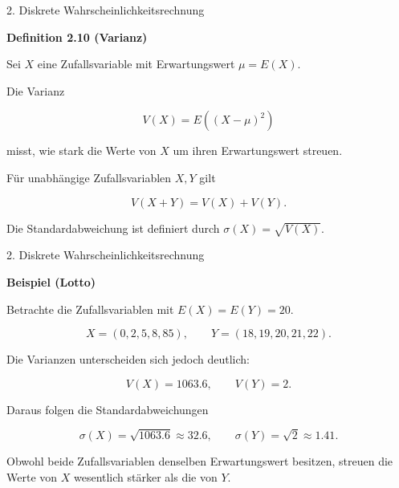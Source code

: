 \documentclass{beamer}
\begin{document}
\begin{frame}{2. Diskrete Wahrscheinlichkeitsrechnung}

\textbf{Definition 2.10 (Varianz)}

\vspace{0.3cm}

Sei \(X\) eine Zufallsvariable mit Erwartungswert \(\mu = E(X).\)

Die Varianz

\[
V(X)
=
E\!\left((X-\mu)^2\right)
\]

misst, wie stark die Werte von \(X\)
um ihren Erwartungswert streuen.

\vspace{0.4cm}

Für unabhängige Zufallsvariablen \(X,Y\) gilt

\[
V(X+Y)=V(X)+V(Y).
\]

\vspace{0.4cm}

Die Standardabweichung ist definiert durch \(\sigma(X)=\sqrt{V(X)}.\)

\end{frame}

\begin{frame}{2. Diskrete Wahrscheinlichkeitsrechnung}

\textbf{Beispiel (Lotto)}

\vspace{0.3cm}

Betrachte die Zufallsvariablen mit \(E(X)=E(Y)=20.\)

\[
X=(0,2,5,8,85),
\qquad
Y=(18,19,20,21,22).
\]

\vspace{0.4cm}

Die Varianzen unterscheiden sich jedoch deutlich:

\[
V(X)=1063.6,
\qquad
V(Y)=2.
\]

\vspace{0.4cm}

Daraus folgen die Standardabweichungen

\[
\sigma(X)=\sqrt{1063.6}\approx 32.6,
\qquad
\sigma(Y)=\sqrt{2}\approx 1.41.
\]

\vspace{0.4cm}

Obwohl beide Zufallsvariablen denselben Erwartungswert besitzen,
streuen die Werte von \(X\) wesentlich stärker als die von \(Y\).

\end{frame}
\end{document}
